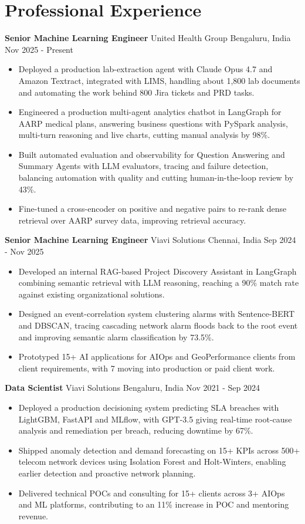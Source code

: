 \documentclass[10pt,a4paper]{article}
\newcommand{\role}[4]{\textbf{#1} \textbar{} #2 \hfill #3 \textbar{} #4\par}
\begin{document}
\section{Professional Experience}
\role{Senior Machine Learning Engineer}{United Health Group}{Bengaluru, India}{Nov 2025 - Present}
\begin{itemize}
  \item Deployed a production lab-extraction agent with Claude Opus 4.7 and Amazon Textract, integrated with LIMS, handling about 1,800 lab documents and automating the work behind 800 Jira tickets and PRD tasks.
  \item Engineered a production multi-agent analytics chatbot in LangGraph for AARP medical plans, answering business questions with PySpark analysis, multi-turn reasoning and live charts, cutting manual analysis by 98\%.
  \item Built automated evaluation and observability for Question Answering and Summary Agents with LLM evaluators, tracing and failure detection, balancing automation with quality and cutting human-in-the-loop review by 43\%.
  \item Fine-tuned a cross-encoder on positive and negative pairs to re-rank dense retrieval over AARP survey data, improving retrieval accuracy.
\end{itemize}
\vspace{3pt}
\role{Senior Machine Learning Engineer}{Viavi Solutions}{Chennai, India}{Sep 2024 - Nov 2025}
\begin{itemize}
  \item Developed an internal RAG-based Project Discovery Assistant in LangGraph combining semantic retrieval with LLM reasoning, reaching a 90\% match rate against existing organizational solutions.
  \item Designed an event-correlation system clustering alarms with Sentence-BERT and DBSCAN, tracing cascading network alarm floods back to the root event and improving semantic alarm classification by 73.5\%.
  \item Prototyped 15+ AI applications for AIOps and GeoPerformance clients from client requirements, with 7 moving into production or paid client work.
\end{itemize}
\vspace{3pt}
\role{Data Scientist}{Viavi Solutions}{Bengaluru, India}{Nov 2021 - Sep 2024}
\begin{itemize}
  \item Deployed a production decisioning system predicting SLA breaches with LightGBM, FastAPI and MLflow, with GPT-3.5 giving real-time root-cause analysis and remediation per breach, reducing downtime by 67\%.
  \item Shipped anomaly detection and demand forecasting on 15+ KPIs across 500+ telecom network devices using Isolation Forest and Holt-Winters, enabling earlier detection and proactive network planning.
  \item Delivered technical POCs and consulting for 15+ clients across 3+ AIOps and ML platforms, contributing to an 11\% increase in POC and mentoring revenue.
\end{itemize}
\end{document}
